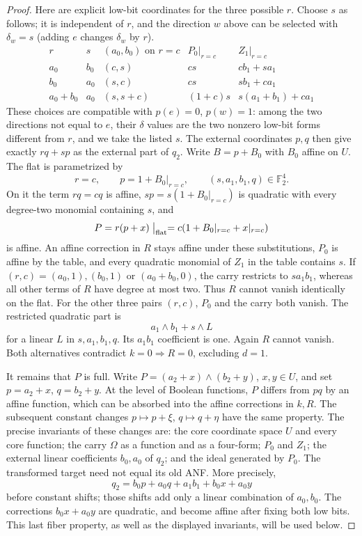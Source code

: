 \documentclass[11pt,a4paper]{article}
\theoremstyle{plain}
\theoremstyle{remark}
\newcommand{\F}{\mathbb F_2}
\begin{document}
\begin{proof}
Here are explicit low-bit coordinates for the three possible $r$. Choose $s$ as follows; it is independent of $r$, and the direction $w$ above can be selected with $\delta_w=s$ (adding $e$ changes $\delta_w$ by $r$).
\[
\begin{array}{c|c|c|c|c}
r&s&(a_0,b_0)\text{ on }r=c&P_0|_{r=c}&Z_1|_{r=c}\\\hline
a_0&b_0&(c,s)&cs&c b_1+s a_1\\
b_0&a_0&(s,c)&cs&s b_1+c a_1\\
a_0+b_0&a_0&(s,s+c)&(1+c)s&s(a_1+b_1)+c a_1
\end{array}
\]
These choices are compatible with $p(e)=0$, $p(w)=1$: among the two directions not equal to $e$, their $\delta$ values are the two nonzero low-bit forms different from $r$, and we take the listed $s$. The external coordinates $p,q$ then give exactly $rq+sp$ as the external part of $q_2$.
Write $B=p+B_0$ with $B_0$ affine on $U$. The flat is parametrized by
\[
r=c,\qquad p=1+B_0|_{r=c},\qquad (s,a_1,b_1,q)\in\F^4.
\]
On it the term $rq=cq$ is affine, $sp=s(1+B_0|_{r=c})$ is quadratic with every degree-two monomial containing $s$, and
\[
P=r(p+x)\bigm|_{\rm flat}=c(1+B_0|_{r=c}+x|_{r=c})
\]
is affine. An affine correction in $R$ stays affine under these substitutions, $P_0$ is affine by the table, and every quadratic monomial of $Z_1$ in the table contains $s$.
If $(r,c)=(a_0,1),(b_0,1)$ or $(a_0+b_0,0)$, the carry restricts to $sa_1b_1$, whereas all other terms of $R$ have degree at most two. Thus $R$ cannot vanish identically on the flat.
For the other three pairs $(r,c)$, $P_0$ and the carry both vanish. The restricted quadratic part is
\[
a_1\wedge b_1+s\wedge L
\]
for a linear $L$ in $s,a_1,b_1,q$. Its $a_1b_1$ coefficient is one. Again $R$ cannot vanish. Both alternatives contradict $k=0\Rightarrow R=0$, excluding $d=1$.

It remains that $P$ is full. Write $P=(a_2+x)\wedge(b_2+y)$, $x,y\in U$, and set $p=a_2+x$, $q=b_2+y$. At the level of Boolean functions, $P$ differs from $pq$ by an affine function, which can be absorbed into the affine corrections in $k,R$. The subsequent constant changes $p\mapsto p+\xi$, $q\mapsto q+\eta$ have the same property.
The precise invariants of these changes are: the core coordinate space $U$ and every core function; the carry $\Omega$ as a function and as a four-form; $P_0$ and $Z_1$; the external linear coefficients $b_0,a_0$ of $q_2$; and the ideal generated by $P_0$. The transformed target need not equal its old ANF. More precisely,
\[
q_2=b_0p+a_0q+a_1b_1+b_0x+a_0y
\]
before constant shifts; those shifts add only a linear combination of $a_0,b_0$. The corrections $b_0x+a_0y$ are quadratic, and become affine after fixing both low bits. This last fiber property, as well as the displayed invariants, will be used below.


\end{proof}
\end{document}
